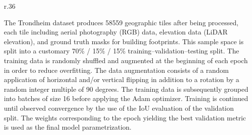 
\begin{wrapfigure}[10]{r}{.36\textwidth}
  \vspace{-0.5\baselineskip}
\end{wrapfigure}

The Trondheim dataset produces \num{58559} geographic tiles after being processed, each tile including aerial photography (RGB) data, elevation data (LiDAR elevation), and ground truth masks for building footprints.
This sample space is split into a customary 70\% / 15\% / 15\% training--validation--testing split.
The training data is randomly shuffled and augmented at the beginning of each epoch in order to reduce overfitting.
The data augmentation consists of a random application of horizontal and/or vertical flipping in addition to a rotation by a random integer multiple of 90 degrees.
The training data is subsequently grouped into batches of size 16 before applying the Adam optimizer.
Training is continued until observed convergence by the use of the IoU evaluation of the validation split.
The weights corresponding to the epoch yielding the best validation metric is used as the final model parametrization.


